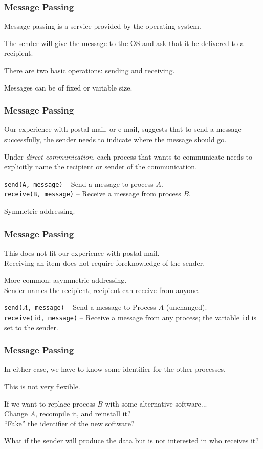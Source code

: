 \begin{frame}
\frametitle{Message Passing}

Message passing is a service provided by the operating system.

The sender will give the message to the OS and ask that it be delivered to a recipient.

  There are two basic operations: sending and receiving. 
  
  Messages can be of fixed or variable size.


\end{frame}

\begin{frame}
\frametitle{Message Passing}

Our experience with postal mail, or e-mail, suggests that to send a message successfully, the sender needs to indicate where the message should go. 

Under \textit{direct communication}, each process that wants to communicate needs to explicitly name the recipient or sender of the communication.


\texttt{send(A, message)} -- Send a message to process $A$.\\
\texttt{receive(B, message)} -- Receive a message from process $B$.

Symmetric addressing.

\end{frame}

\begin{frame}
\frametitle{Message Passing}

This does not fit our experience with postal mail.\\
\quad Receiving an item does not require foreknowledge of the sender.

More common: asymmetric addressing.\\
\quad Sender names the recipient; recipient can receive from anyone.

\texttt{send($A$, message)} -- Send a message to Process $A$ (unchanged).\\
\texttt{receive(id, message)} -- Receive a message from any process; the variable \texttt{id} is set to the sender.

\end{frame}

\begin{frame}
\frametitle{Message Passing}

In either case, we have to know some identifier for the other processes. 

This is not very flexible.

If we want to replace process $B$ with some alternative software...\\
\quad Change $A$, recompile it, and reinstall it?\\
\quad ``Fake'' the identifier of the new software? 

What if the sender will produce the data but is not interested in who receives it?

\end{frame}

